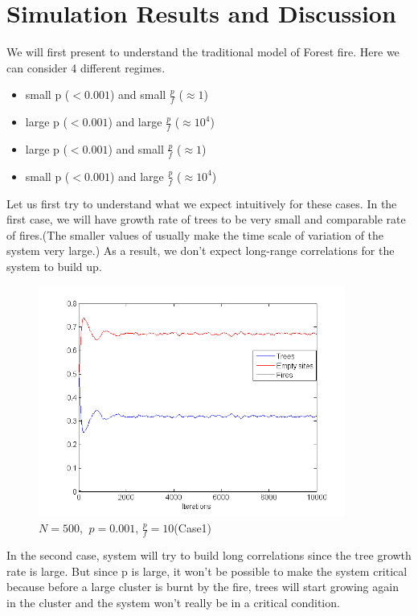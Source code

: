 \documentclass[11pt]{article}
\begin{document}
\section{Simulation Results and Discussion}
We will first present to understand the traditional model of Forest fire. Here we can consider 4 different regimes. 
\begin{itemize}
\item small p ($< 0.001$) and small $\frac{p}{f}$ ($\approx 1$)
\item large p ($< 0.001$) and large $\frac{p}{f}$ ($\approx 10^4$)
\item large p ($< 0.001$) and small $\frac{p}{f}$ ($\approx 1$)
\item small p ($< 0.001$) and large $\frac{p}{f}$ ($\approx 10^4$)
\end{itemize}

Let us first try to understand what we expect intuitively for these cases. In the first case, we will have growth rate of trees to be very small and comparable rate of fires.(The smaller values of usually make the time scale of variation of the system very large.) As a result, we don't expect long-range correlations for the system to build up.\\

\begin{figure}[H]
\centering
\includegraphics[width=0.9\textwidth,keepaspectratio=true,]{Pictures/case1_size_500.png}
\caption{$N=500$, $\ p=0.001$, $\frac{p}{f}=10$(Case1)}
\end{figure}

In the second case, system will try to build long correlations since the tree growth rate is large. But since p is large, it won't be possible to make the system critical because before a large cluster is burnt by the fire, trees will start growing again in the cluster and the system won't really be in a critical condition.\\
\end{document}
